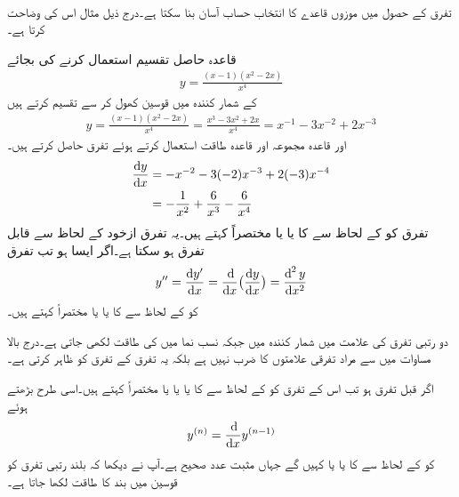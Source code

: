 \\
تفرق کے حصول میں موزوں قاعدے کا انتخاب حساب آسان بنا سکتا ہے۔درج ذیل مثال اس کی وضاحت کرتا ہے۔ 

قاعدہ حاصل تقسیم استعمال کرنے کی بجائے
\begin{align*}
y=\frac{(x-1)(x^2-2x)}{x^4}
\end{align*}
کے شمار کنندہ میں قوسین کھول کر  سے تقسیم کرتے ہیں
\begin{align*}
y=\frac{(x-1)(x^2-2x)}{x^4}=\frac{x^3-3x^2+2x}{x^4}=x^{-1}-3x^{-2}+2x^{-3}
\end{align*}
اور قاعدہ مجموعہ اور قاعدہ طاقت استعمال کرتے ہوئے تفرق حاصل کرتے ہیں۔
\begin{align*}
\frac{\dif y}{\dif x}&=-x^{-2}-3(-2)x^{-3}+2(-3)x^{-4}\\
&=-\frac{1}{x^2}+\frac{6}{x^3}-\frac{6}{x^4}
\end{align*}
تفرق  کو  کے لحاظ سے  کا  یا  یا مختصراً  کہتے ہیں۔یہ تفرق ازخود  کے لحاظ سے قابل تفرق ہو سکتا ہے۔اگر ایسا ہو تب تفرق
\begin{align*}
y''=\frac{\dif y'}{\dif x}=\frac{\dif}{\dif x}\big(\frac{\dif y}{\dif x}\big)=\frac{\dif^{\,2} y}{\dif x^2}
\end{align*}
کو  کے لحاظ سے  کا  یا  یا مختصراً  کہتے ہیں۔

دو رتبی تفرق کی علامت   میں شمار کنندہ میں  جبکہ نسب نما میں  کی طاقت  لکھی جاتی ہے۔درج بالا مساوات میں  سے مراد تفرقی علامتوں کا ضرب نہیں ہے بلکہ یہ تفرق کے تفرق کو ظاہر کرتی ہے۔

اگر  قبل تفرق ہو تب اس کے تفرق  کو  کے لحاظ سے  کا  یا  یا  یا مختصراً  کہتے ہیں۔اسی طرح بڑھتے ہوئے
\begin{align*}
y^{(n)}=\frac{\dif}{\dif x}y^{(n-1)}
\end{align*}
کو  کے لحاظ سے  کا  یا  یا  کہیں گے جہاں  مثبت عدد صحیح ہے۔آپ نے دیکھا کہ بلند رتبی تفرق کو قوسین میں بند  کا طاقت لکھا جاتا ہے۔

